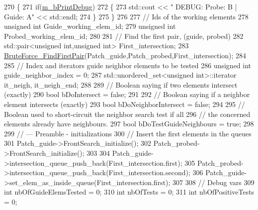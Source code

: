 \begin{DoxyCode}
270         \{
271             \textcolor{keywordflow}{if}(\hyperlink{classcarl_1_1_intersection___search_af69485e014f8178ec6c6dcbd95bf9dc9}{m\_bPrintDebug})
272             \{
273                 std::cout << \textcolor{stringliteral}{"    DEBUG:     Probe: B     |     Guide: A"} << std::endl;
274             \}
275         \}
276 
277         \textcolor{comment}{// Ids of the working elements}
278         \textcolor{keywordtype}{unsigned} \textcolor{keywordtype}{int} Guide\_working\_elem\_id;
279         \textcolor{keywordtype}{unsigned} \textcolor{keywordtype}{int} Probed\_working\_elem\_id;
280 
281         \textcolor{comment}{// Find the first pair, (guide, probed)}
282         std::pair<unsigned int,unsigned int> First\_intersection;
283         \hyperlink{classcarl_1_1_intersection___search_a7b67f7bd29530492dbd0b0eeca67645b}{BruteForce\_FindFirstPair}(Patch\_guide,Patch\_probed,First\_intersection);
284 
285         \textcolor{comment}{// Index and iterators guide neighbor elements to be tested}
286         \textcolor{keywordtype}{unsigned} \textcolor{keywordtype}{int} guide\_neighbor\_index = 0;
287         std::unordered\_set<unsigned int>::iterator it\_neigh, it\_neigh\_end;
288 
289         \textcolor{comment}{// Boolean saying if two elements intersect (exactly)}
290         \textcolor{keywordtype}{bool} bDoIntersect = \textcolor{keyword}{false};
291 
292         \textcolor{comment}{// Boolean saying if a neighbor element intersects (exactly)}
293         \textcolor{keywordtype}{bool} bDoNeighborIntersect = \textcolor{keyword}{false};
294 
295         \textcolor{comment}{// Boolean used to short-circuit the neighbor search test if all}
296         \textcolor{comment}{// the concerned elements already have neighbours.}
297         \textcolor{keywordtype}{bool} bDoTestGuideNeighbours = \textcolor{keyword}{true};
298 
299         \textcolor{comment}{// --- Preamble - initializations}
300         \textcolor{comment}{// Insert the first elements in the queues}
301         Patch\_guide->FrontSearch\_initialize();
302         Patch\_probed->FrontSearch\_initialize();
303 
304         Patch\_guide->intersection\_queue\_push\_back(First\_intersection.first);
305         Patch\_probed->intersection\_queue\_push\_back(First\_intersection.second);
306         Patch\_guide->set\_elem\_as\_inside\_queue(First\_intersection.first);
307 
308         \textcolor{comment}{// Debug vars}
309         \textcolor{keywordtype}{int} nbOfGuideElemsTested = 0;
310         \textcolor{keywordtype}{int} nbOfTests = 0;
311         \textcolor{keywordtype}{int} nbOfPositiveTests = 0;

\end{DoxyCode}
